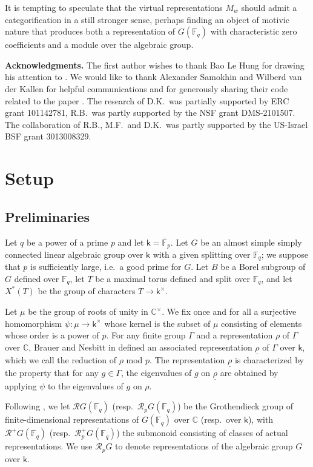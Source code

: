\documentclass{amsart}
\theoremstyle{definition}
\begin{document}
It is tempting to speculate that the virtual representations $M_w$ should admit a categorification in 
  a still stronger sense,  perhaps finding an object of motivic nature that
produces both a representation of $G(\mathbb{F}_q)$ with characteristic zero coefficients and a
module over the algebraic group. 

{\bf Acknowledgments.} The first author wishes to thank Bao Le Hung for drawing his attention to \cite{L}. We would like to thank Alexander Samokhin and Wilberd van der Kallen for helpful communications and for generously sharing their code related to the paper \cite{SVK}. The research of D.K.\ was partially supported by ERC grant 101142781, R.B.\ was partly supported by the NSF grant DMS-2101507. The collaboration of R.B., M.F.\ and D.K.\ was partly supported by the US-Israel BSF grant 3013008329. %

\section{Setup}

\subsection{Preliminaries}
Let $q$ be a power of a prime $p$ and let $\mathsf{k} = \overline{\mathbb{F}}_p$. Let $G$ be an almost simple simply connected linear algebraic group over $\mathsf{k}$ with a given splitting over $\mathbb{F}_q$; we suppose that $p$ is sufficiently large, i.e.\ a good prime for $G$. Let $B$ be a Borel subgroup of $G$ defined over $\mathbb{F}_q$, let $T$ be a maximal torus defined and split over $\mathbb{F}_q$, and let $X^*(T)$ be the group of characters $T \to \mathsf{k}^\times$.

Let $\mu$ be the group of roots of unity in $\mathbb{C}^\times$. We fix once and for all a surjective homomorphism $\psi \colon  \mu \to \mathsf{k}^\times$ whose kernel is the subset of $\mu$ consisting of elements whose order is a power of $p$. For any finite group $\Gamma$ and a representation $\rho$ of $\Gamma$ over $\mathbb{C}$, Brauer and Nesbitt in \cite{BN} defined an associated representation $\underline{\rho}$ of $\Gamma$ over $\mathsf{k}$, which we call the reduction of $\rho$ mod $p$. The representation $\underline{\rho}$ is characterized by the property that for any $g \in \Gamma$, the eigenvalues of $g$ on $\underline{\rho}$ are obtained by applying $\psi$ to the eigenvalues of $g$ on $\rho$.

Following \cite[Section 0.1]{L}, we let $\mathcal{R}G(\mathbb{F}_q)$ (resp.\ $\mathcal{R}_pG(\mathbb{F}_q)$) be the Grothendieck group of finite-dimensional representations of $G(\mathbb{F}_q)$ over $\mathbb{C}$ (resp.\ over $\mathsf{k}$), with $\mathcal{R}^+G(\mathbb{F}_q)$ (resp.\ $\mathcal{R}_p^+G(\mathbb{F}_q)$) the submonoid consisting of classes of actual representations. We use $\mathcal{R}_pG$ to denote representations of the algebraic group $G$ over $\mathsf{k}$. 
\end{document}
